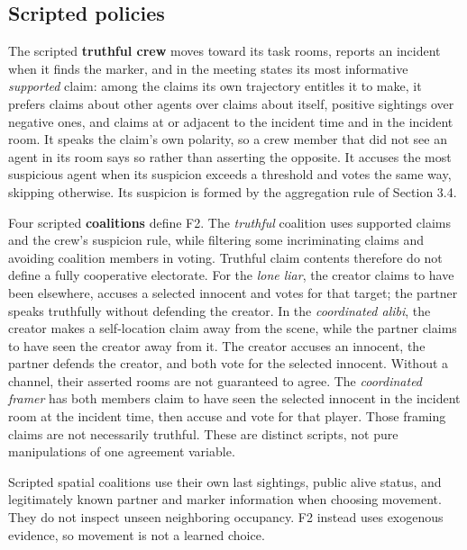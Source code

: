 \documentclass[
  12pt,
]{article}
\begin{document}
\FloatBarrier

\subsection{Scripted policies}\label{scripted-policies}

The scripted \textbf{truthful crew} moves toward its task rooms, reports
an incident when it finds the marker, and in the meeting states its most
informative \emph{supported} claim: among the claims its own trajectory
entitles it to make, it prefers claims about other agents over claims
about itself, positive sightings over negative ones, and claims at or
adjacent to the incident time and in the incident room. It speaks the
claim's own polarity, so a crew member that did not see an agent in its
room says so rather than asserting the opposite. It accuses the most
suspicious agent when its suspicion exceeds a threshold and votes the
same way, skipping otherwise. Its suspicion is formed by the aggregation
rule of Section 3.4.

Four scripted \textbf{coalitions} define F2. The \emph{truthful}
coalition uses supported claims and the crew's suspicion rule, while
filtering some incriminating claims and avoiding coalition members in
voting. Truthful claim contents therefore do not define a fully
cooperative electorate. For the \emph{lone liar}, the creator claims to
have been elsewhere, accuses a selected innocent and votes for that
target; the partner speaks truthfully without defending the creator. In
the \emph{coordinated alibi}, the creator makes a self-location claim
away from the scene, while the partner claims to have seen the creator
away from it. The creator accuses an innocent, the partner defends the
creator, and both vote for the selected innocent. Without a channel,
their asserted rooms are not guaranteed to agree. The \emph{coordinated
framer} has both members claim to have seen the selected innocent in the
incident room at the incident time, then accuse and vote for that
player. Those framing claims are not necessarily truthful. These are
distinct scripts, not pure manipulations of one agreement variable.

Scripted spatial coalitions use their own last sightings, public alive
status, and legitimately known partner and marker information when
choosing movement. They do not inspect unseen neighboring occupancy. F2
instead uses exogenous evidence, so movement is not a learned choice.

\FloatBarrier
\end{document}

